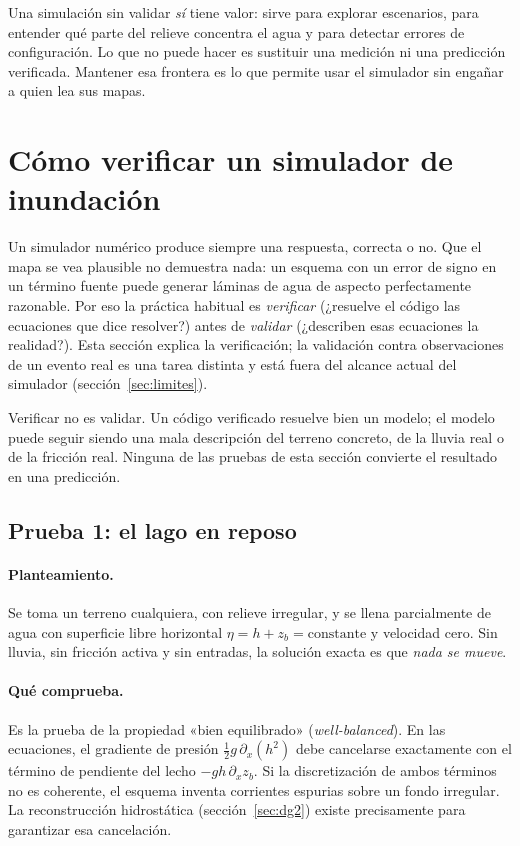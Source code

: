 \documentclass[11pt,a4paper]{article}
\begin{document}
\begin{intuicion}
Una simulación sin validar \emph{sí} tiene valor: sirve para explorar escenarios, para entender qué parte del
relieve concentra el agua y para detectar errores de configuración. Lo que no puede hacer es sustituir una
medición ni una predicción verificada. Mantener esa frontera es lo que permite usar el simulador sin engañar
a quien lea sus mapas.
\end{intuicion}


\section{Cómo verificar un simulador de inundación}
\label{sec:verificacion}

Un simulador numérico produce siempre una respuesta, correcta o no. Que el mapa se vea plausible no demuestra
nada: un esquema con un error de signo en un término fuente puede generar láminas de agua de aspecto
perfectamente razonable. Por eso la práctica habitual es \emph{verificar} (¿resuelve el código las ecuaciones
que dice resolver?) antes de \emph{validar} (¿describen esas ecuaciones la realidad?). Esta sección explica la
verificación; la validación contra observaciones de un evento real es una tarea distinta y está fuera del
alcance actual del simulador (sección~\ref{sec:limites}).

\begin{atencion}
Verificar no es validar. Un código verificado resuelve bien un modelo; el modelo puede seguir siendo una mala
descripción del terreno concreto, de la lluvia real o de la fricción real. Ninguna de las pruebas de esta
sección convierte el resultado en una predicción.
\end{atencion}

\subsection{Prueba 1: el lago en reposo}

\paragraph{Planteamiento.} Se toma un terreno cualquiera, con relieve irregular, y se llena parcialmente de
agua con superficie libre horizontal $\eta=h+z_b=\text{constante}$ y velocidad cero. Sin lluvia, sin fricción
activa y sin entradas, la solución exacta es que \emph{nada se mueve}.

\paragraph{Qué comprueba.} Es la prueba de la propiedad «bien equilibrado» (\emph{well-balanced}). En las
ecuaciones, el gradiente de presión $\tfrac12 g\,\partial_x(h^2)$ debe cancelarse exactamente con el término de
pendiente del lecho $-gh\,\partial_xz_b$. Si la discretización de ambos términos no es coherente, el esquema
inventa corrientes espurias sobre un fondo irregular. La reconstrucción hidrostática (sección~\ref{sec:dg2})
existe precisamente para garantizar esa cancelación.
\end{document}
